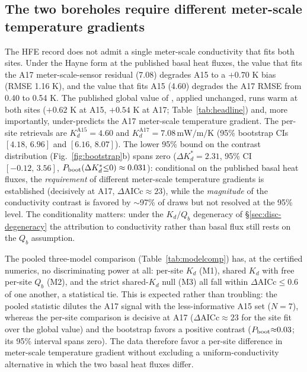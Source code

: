 \documentclass[11pt]{article}
\begin{document}
\subsection{The two boreholes require different meter-scale temperature gradients}%
\label{sec:disc-kd}
The HFE record does not admit a single meter-scale %
conductivity that fits both sites. Under the Hayne form at the published
basal heat fluxes, the value that fits the A17
meter-scale-sensor residual
(7.08) degrades
A15 to a $+0.70$ K bias (RMSE 1.16 K), and the value that
fits A15 (4.60) degrades the A17 RMSE from 0.40 to 0.54 K. The
published global value of \citet{hayne2017}, applied
unchanged, runs warm at both sites ($+0.62$ K at A15, $+0.54$ K at A17;
Table~\ref{tab:headline}) and, more importantly, under-predicts the
A17 meter-scale temperature gradient. The
per-site retrievals are $K_d^{\mathrm{A15}}=4.60$ and
$K_d^{\mathrm{A17}}=7.08\,\si{\milli\watt\per\meter\per\kelvin}$ (95\%
bootstrap CIs $[4.18,\,6.96]$
and $[6.16,\,8.07]$). The lower 95\% bound
on the contrast distribution (Fig.~\ref{fig:bootstrap}b)
spans zero
($\Delta K_d^{*}=2.31$, 95\% CI $[-0.12,\,3.56]$,
$P_{\rm boot}(\Delta K_d^{*}{\le}0)\approx 0.031$):
conditional on the published basal heat fluxes, the \emph{requirement} of
different meter-scale temperature gradients is established (decisively at
A17, $\Delta\mathrm{AICc}\approx 23$), while the \emph{magnitude} of the
conductivity contrast is favored by $\sim$97\% of draws but not resolved
at the 95\% level. The conditionality matters: under the $K_d/Q_b$
degeneracy of \S\ref{sec:disc-degeneracy} the attribution to
conductivity rather than basal flux still rests on the $Q_b$
assumption.

The pooled three-model comparison (Table~\ref{tab:modelcomp})
has, at the certified
numerics, no discriminating power at all: per-site
$K_d$ (M1), shared $K_d$ with free per-site $Q_b$ (M2), and the strict
shared-$K_d$ null (M3) all fall within $\Delta\mathrm{AICc}\le 0.6$ of
one another, a statistical tie. This is expected rather than
troubling: the pooled statistic dilutes the A17 signal with the
less-informative A15 set ($N=7$), whereas the per-site comparison is
decisive at A17 ($\Delta\mathrm{AICc}\approx 23$ for the site fit over
the global value) and the bootstrap favors a positive
contrast ($P_{\rm boot}{\approx}0.03$; its 95\% interval spans zero). The
data therefore favor a per-site difference in
meter-scale temperature gradient without excluding a
uniform-conductivity alternative in which the two basal heat fluxes differ.
\end{document}
